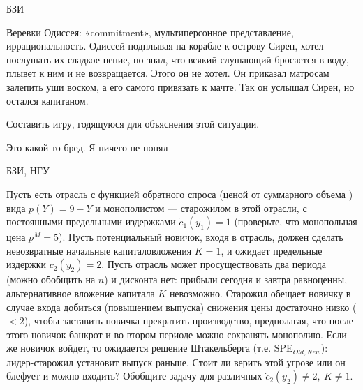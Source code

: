 \begin{problem}
\begin{source}
БЗИ
\end{source}
 {\rm Веревки Одиссея: «commitment», мультиперсонное
представление, иррациональность.} Одиссей подплывая на
корабле к острову Сирен, хотел послушать их сладкое пение,
но знал, что всякий слушающий бросается в воду, плывет к
ним и не возвращается. Этого он не хотел. Он приказал
матросам залепить уши воском, а его самого привязать к
мачте. Так он услышал Сирен, но остался капитаном.

Составить игру, годящуюся для объяснения этой ситуации.


{\red Это какой-то бред. Я ничего не понял}

\begin{sol}

\end{sol}
\end{problem}




\begin{problem}
\begin{source}
БЗИ, НГУ
\end{source} Пусть есть отрасль с
функцией обратного спроса (ценой от суммарного объема ) вида
$p(Y)=9-Y$ и монополистом — старожилом в этой отрасли, с
постоянными предельными издержками $\dot{c}_1(y_1)=1$
(проверьте, что монопольная цена $p^M=5$). Пусть
потенциальный новичок, входя в отрасль, должен сделать
невозвратные начальные капиталовложения $K=1$, и ожидает
предельные издержки $\dot{c}_2(y_2)=2$. Пусть отрасль может
просуществовать два периода (можно обобщить на $n$) и
дисконта нет: прибыли сегодня и завтра равноценны,
альтернативное вложение капитала $K$ невозможно. Старожил
обещает новичку в случае входа добиться (повышением
выпуска) снижения цены достаточно низко ($<2$), чтобы
заставить новичка прекратить производство, предполагая, что
после этого новичок банкрот и во втором периоде можно
сохранять монополию. Если же новичок войдет, то ожидается
решение Штакельберга (т.е. SPE$_{Old,New}$): лидер-старожил
установит выпуск раньше. Стоит ли верить этой
угрозе или он блефует и можно входить? Обобщите задачу для
различных $\dot{c}_2(y_2)\neq 2, ~K\neq 1$.






\begin{sol}

\end{sol}
\end{problem}




